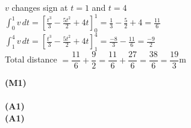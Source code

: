 \documentclass[12pt, twoside]{article}
\begin{document}
\begin{enumerate}[itemsep=0.2cm]
\begin{enumerate}[itemsep=0.3cm]
  \begin{minipage}[t]{0.62\textwidth}
  $v$ changes sign at $t = 1$ and $t = 4$\\[0.15cm]
  $\displaystyle\int_0^1 v\,dt
    = \left[\frac{t^3}{3} - \frac{5t^2}{2} + 4t\right]_0^1
    = \frac{1}{3} - \frac{5}{2} + 4 = \frac{11}{6}$\\[0.3cm]
  $\displaystyle\int_1^4 v\,dt
    = \left[\frac{t^3}{3} - \frac{5t^2}{2} + 4t\right]_1^4
    = \frac{-8}{3} - \frac{11}{6} = \frac{-9}{2}$\\[0.3cm]
  Total distance $= \dfrac{11}{6} + \dfrac{9}{2}
    = \dfrac{11}{6} + \dfrac{27}{6} = \dfrac{38}{6} = \dfrac{19}{3}$\;m
  \end{minipage}%
  \begin{minipage}[t]{0.35\textwidth}\raggedleft
  \textbf{(M1)}\\[0.15cm]
  ~\\[0.3cm]
  \textbf{(A1)}\\[0.6cm]
  \textbf{(A1)}
  \end{minipage}
\end{enumerate}

\end{enumerate}
\end{document}
